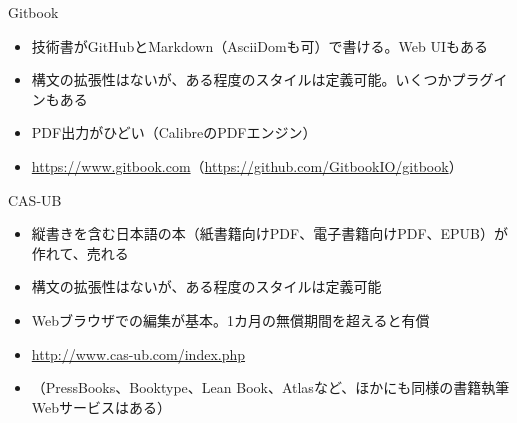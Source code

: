 %  
%

\begin{frame}[containsverbatim, t]{\inhibitglue Gitbook}
  \sffamily
  
  \begin{itemize}
    \item 技術書がGitHubとMarkdown（AsciiDomも可）で書ける。Web UIもある
    \item 構文の拡張性はないが、ある程度のスタイルは定義可能。いくつかプラグインもある
    \item PDF出力がひどい（CalibreのPDFエンジン）
    \item \url{https://www.gitbook.com}（\url{https://github.com/GitbookIO/gitbook}）
  \end{itemize}

\end{frame}

\begin{frame}[containsverbatim, t]{\inhibitglue CAS-UB}
  \sffamily
  
  \begin{itemize}
    \item 縦書きを含む日本語の本（紙書籍向けPDF、電子書籍向けPDF、EPUB）が作れて、売れる
    \item 構文の拡張性はないが、ある程度のスタイルは定義可能
    \item Webブラウザでの編集が基本。1カ月の無償期間を超えると有償
    \item \url{http://www.cas-ub.com/index.php}
    \item （PressBooks、Booktype、Lean Book、Atlasなど、ほかにも同様の書籍執筆Webサービスはある）
  \end{itemize}

\end{frame}

%  
%

